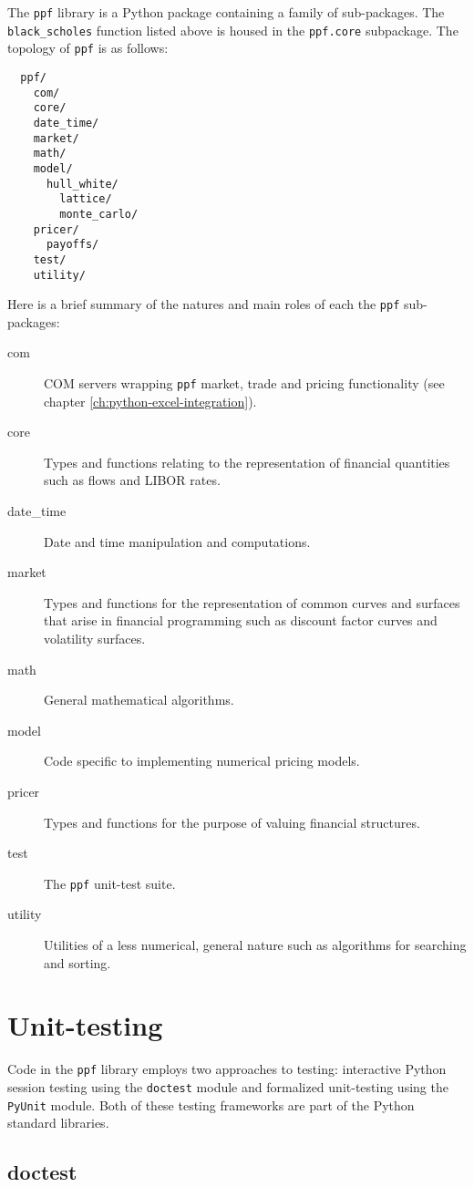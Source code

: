 The \verb|ppf| library is a Python package containing a family of
sub-packages. The \verb|black_scholes| function listed above is housed
in the \verb|ppf.core| subpackage. The topology of \verb|ppf| is as
follows:
\begin{verbatim}
  ppf/
    com/
    core/
    date_time/
    market/
    math/
    model/
      hull_white/
        lattice/
        monte_carlo/
    pricer/
      payoffs/
    test/
    utility/
\end{verbatim}
Here is a brief summary of the natures and main roles of each the
\verb|ppf| sub-packages:
\begin{description}
\item[com] COM servers wrapping \verb|ppf| market, trade and pricing
functionality (see chapter \ref{ch:python-excel-integration}).
\item[core] Types and functions relating to the representation of
financial quantities such as flows and LIBOR rates.
\item[date\_time] Date and time manipulation and computations.
\item[market] Types and functions for the representation of common
curves and surfaces that arise in financial programming such as
discount factor curves and volatility surfaces.
\item[math] General mathematical algorithms.
\item[model] Code specific to implementing numerical pricing models.
\item[pricer] Types and functions for the purpose of valuing financial
structures.
\item[test] The \verb|ppf| unit-test suite.
\item[utility] Utilities of a less numerical, general nature such as
algorithms for searching and sorting.
\end{description}

\section{Unit-testing}

Code in the \verb|ppf| library employs two approaches to testing:
interactive Python session testing using the \verb|doctest| module and
formalized unit-testing using the \verb|PyUnit| module. Both of these
testing frameworks are part of the Python standard libraries.

\subsection{doctest}

